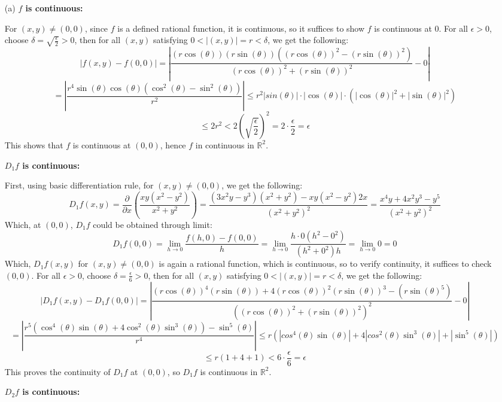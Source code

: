 \documentclass{article}
\begin{document}
\begin{itemize}
    \item[(a)] \textbf{$f$ is continuous:}
    
    For $(x,y)\neq (0,0)$, since $f$ is a defined rational function, it is continuous, so it suffices to show $f$ is continuous at $0$. For all $\epsilon>0$, choose $\delta=\sqrt{\frac{\epsilon}{2}}>0$, then for all $(x,y)$ satisfying $0<|(x,y)|=r<\delta$, we get the following:
    $$|f(x,y)-f(0,0)|=\left|\frac{(r\cos(\theta))(r\sin(\theta))((r\cos(\theta))^2-(r\sin(\theta))^2)}{(r\cos(\theta))^2+(r\sin(\theta))^2}-0\right|$$
    $$ = \left|\frac{r^4\sin(\theta)\cos(\theta)(\cos^2(\theta)-\sin^2(\theta))}{r^2}\right| \leq r^2|sin(\theta)|\cdot |\cos(\theta)|\cdot (|\cos(\theta)|^2+|\sin(\theta)|^2)$$
    $$\leq 2r^2 < 2\left(\sqrt{\frac{\epsilon}{2}}\right)^2 = 2\cdot\frac{\epsilon}{2} = \epsilon$$
    This shows that $f$ is continuous at $(0,0)$, hence $f$ in continuous in $\mathbb{R}^2$.

    \hfil

    \textbf{$D_1f$ is continuous:}

    First, using basic differentiation rule, for $(x,y)\neq (0,0)$, we get the following:
    $$D_1f(x,y) = \frac{\partial}{\partial x}\left(\frac{xy(x^2-y^2)}{x^2+y^2}\right) = \frac{(3x^2y-y^3)(x^2+y^2)-xy(x^2-y^2)2x}{(x^2+y^2)^2} = \frac{x^4y+4x^2y^3-y^5}{(x^2+y^2)^2}$$
    Which, at $(0,0)$, $D_1f$ could be obtained through limit:
    $$D_1f(0,0)=\lim_{h\rightarrow 0}\frac{f(h,0)-f(0,0)}{h} = \lim_{h\rightarrow 0}\frac{h\cdot 0(h^2-0^2)}{(h^2+0^2)h} = \lim_{h\rightarrow 0} 0 = 0$$
    Which, $D_1f(x,y)$ for $(x,y)\neq (0,0)$ is again a rational function, which is continuous, so to verify continuity, it suffices to check $(0,0)$. For all $\epsilon>0$, choose $\delta=\frac{\epsilon}{6}>0$, then for all $(x,y)$ satisfying $0<|(x,y)|=r<\delta$, we get the following:
    $$|D_1f(x,y)-D_1f(0,0)| = \left|\frac{(r\cos(\theta))^4(r\sin(\theta))+4(r\cos(\theta))^2(r\sin(\theta))^3-(r\sin(\theta)^5)}{((r\cos(\theta))^2+(r\sin(\theta))^2)^2}-0\right|$$
    $$ = \left|\frac{r^5(\cos^4(\theta)\sin(\theta)+4\cos^2(\theta)\sin^3(\theta))-\sin^5(\theta)}{r^4}\right| \leq r(|cos^4(\theta)\sin(\theta)|+4|cos^2(\theta)\sin^3(\theta)|+|\sin^5(\theta)|)$$
    $$\leq r(1+4+1) < 6\cdot\frac{\epsilon}{6} = \epsilon$$
    This proves the continuity of $D_1f$ at $(0,0)$, so $D_1f$ is continuous in $\mathbb{R}^2$.

    \hfil

    \textbf{$D_2f$ is continuous:}


\end{itemize}
\end{document}
